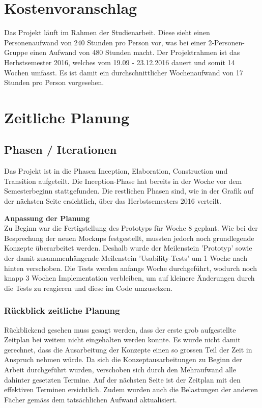 
 \section{Kostenvoranschlag}
 Das Projekt läuft im Rahmen der Studienarbeit. Diese sieht einen Personenaufwand von 240 Stunden pro Person vor, was bei einer 2-Personen-Gruppe einen Aufwand von 480 Stunden macht. 
 Der Projektrahmen ist das Herbstsemester 2016, welches vom 19.09 - 23.12.2016 dauert und somit 14 Wochen umfasst. Es ist damit ein durchschnittlicher Wochenaufwand von 17 Stunden pro Person vorgesehen.
 
 
 \section{Zeitliche Planung}
 
 \subsection{Phasen / Iterationen}
 Das Projekt ist in die Phasen Inception, Elaboration, Construction und Transition aufgeteilt. Die Inception-Phase hat bereits in der Woche vor dem Semesterbeginn stattgefunden. Die restlichen Phasen sind, wie in der Grafik auf der nächsten Seite ersichtlich, über das Herbstsemesters 2016 verteilt.
 
 \bigskip
 \textbf{Anpassung der Planung}\\
 
 Zu Beginn war die Fertigstellung des Prototyps für Woche 8 geplant. Wie bei der Besprechung der neuen Mockups festgestellt, mussten jedoch noch grundlegende Konzepte überarbeitet werden. Deshalb wurde der Meilenstein 'Prototyp' sowie der damit zusammenhängende Meilenstein 'Usability-Tests' um 1 Woche nach hinten verschoben. Die Tests werden anfangs Woche durchgeführt, wodurch noch knapp 3 Wochen Implementation verbleiben, um auf kleinere Änderungen durch die Tests zu reagieren und diese im Code umzusetzen.
 



 
 \subsubsection{Rückblick zeitliche Planung}
 Rückblickend gesehen muss gesagt werden, dass der erste grob aufgestellte Zeitplan bei weitem nicht eingehalten werden konnte. Es wurde nicht damit gerechnet, dass die Ausarbeitung der Konzepte einen so grossen Teil der Zeit in Anspruch nehmen würde. Da sich die Konzeptausarbeitungen zu Beginn der Arbeit durchgeführt wurden, verschoben sich durch den Mehraufwand alle dahinter gesetzten Termine. Auf der nächsten Seite ist der Zeitplan mit den effektiven Terminen ersichtlich. Zudem wurden auch die Belastungen der anderen Fächer gemäss dem tatsächlichen Aufwand aktualisiert.
 
